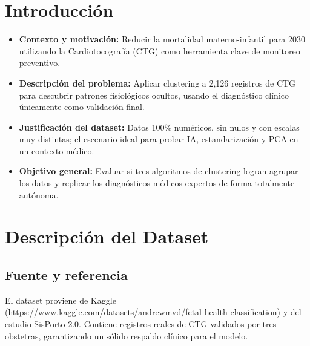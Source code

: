 \documentclass[12pt,letterpaper]{article}
\begin{document}


\newpage

\tableofcontents

\newpage

\section{Introducción}

\begin{itemize}
    \item \textbf{Contexto y motivación:} Reducir la mortalidad materno-infantil para 2030 utilizando la Cardiotocografía (CTG) como herramienta clave de monitoreo preventivo.
    \item \textbf{Descripción del problema:} Aplicar clustering a 2,126 registros de CTG para descubrir patrones fisiológicos ocultos, usando el diagnóstico clínico únicamente como validación final.
    \item \textbf{Justificación del dataset:} Datos 100\% numéricos, sin nulos y con escalas muy distintas; el escenario ideal para probar IA, estandarización y PCA en un contexto médico.
    \item \textbf{Objetivo general:} Evaluar si tres algoritmos de clustering logran agrupar los datos y replicar los diagnósticos médicos expertos de forma totalmente autónoma.
\end{itemize}
\section{Descripción del Dataset}

\subsection{Fuente y referencia}

El dataset proviene de Kaggle \\(\url{https://www.kaggle.com/datasets/andrewmvd/fetal-health-classification}) y del estudio SisPorto 2.0. Contiene registros reales de CTG validados por tres obstetras, garantizando un sólido respaldo clínico para el modelo.
\end{document}
